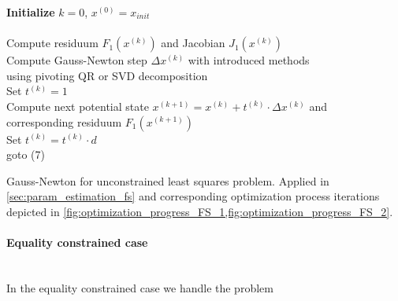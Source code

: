 \documentclass{scrartcl}[12pt, halfparskip]
\numberwithin{equation}{section}
\numberwithin{figure}{section}
\numberwithin{table}{section}
\begin{document}
\begin{algorithm}[H]
	
	
	\textbf{Initialize} $k=0$, $x^{(0)} = x_{init}$ \\\mbox{}\\
	
	Compute residuum $F_1(x^{(k)})$ and Jacobian $J_1(x^{(k)})$ \\
	Compute Gauss-Newton step $\Delta x^{(k)}$ with introduced methods \\
	\quad using pivoting QR or SVD decomposition \\
	Set $t^{(k)} = 1$ \\
	Compute next potential state $x^{(k+1)} = x^{(k)} + t^{(k)} \cdot \Delta x^{(k)}$ and \\ \quad corresponding residuum $F_1(x^{(k+1)})$ \\
	
	{Set $t^{(k)} = t^{(k)} \cdot d$ \\
		goto (7)}

	\caption{Gauss-Newton for unconstrained least squares problem. \newline
		Applied in \cref{sec:param_estimation_fs} and corresponding optimization process iterations depicted in \cref{fig:optimization_progress_FS_1,fig:optimization_progress_FS_2}.}
	\label{alg:Gauss_Newton_unconstrained}
\end{algorithm}


\newpage
\paragraph{Equality constrained case}\mbox{}\\
In the equality constrained case we handle the problem
\end{document}
